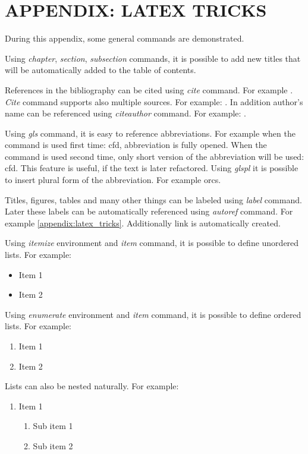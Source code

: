 \chapter{APPENDIX: LATEX TRICKS}\label{appendix:latex_tricks}
During this appendix, some general commands are demonstrated.

Using \textit{chapter}, \textit{section}, \textit{subsection} commands, it is possible to add new titles that will be automatically added to the table of contents.

References in the bibliography can be cited using \textit{cite} command. For example \cite{stratton1976needs}. \textit{Cite} command supports also multiple sources. For example: \cite{hirsijarvi2009tutki, virtanen2011esimerkkilahde}. In addition author's name can be referenced using \textit{citeauthor} command. For example: \citeauthor{hirsijarvi2009tutki}.

Using \textit{gls} command, it is easy to reference abbreviations. For example when the command is used first time: \gls{cfd}, abbreviation is fully opened. When the command is used second time, only short version of the abbreviation will be used: \gls{cfd}. This feature is useful, if the text is later refactored. Using \textit{glspl} it is possible to insert plural form of the abbreviation. For example \glspl{orc}.

Titles, figures, tables and many other things can be labeled using \textit{label} command. Later these labels can be automatically referenced using \textit{autoref} command. For example \autoref{appendix:latex_tricks}. Additionally link is automatically created.

Using \textit{itemize} environment and \textit{item} command, it is possible to define unordered lists. For example:
\begin{itemize}[noitemsep]
	\item Item 1
	\item Item 2
\end{itemize}

Using \textit{enumerate} environment and \textit{item} command, it is possible to define ordered lists. For example:
\begin{enumerate}[noitemsep]
	\item Item 1
	\item Item 2
\end{enumerate}

Lists can also be nested naturally. For example:
\begin{enumerate}[noitemsep]
	\item Item 1
	\begin{enumerate}[noitemsep]
		\item Sub item 1
		\item Sub item 2
	\end{enumerate}
\end{enumerate}

